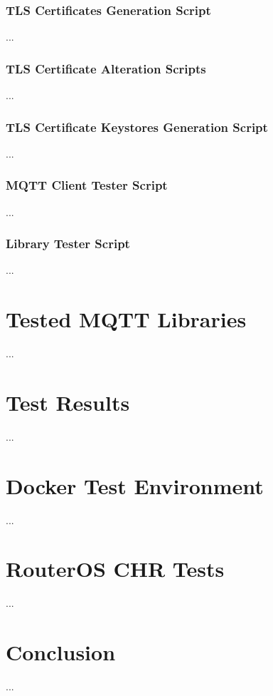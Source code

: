 \documentclass[binding=0.6cm,noexaminfo]{sapthesis}
\begin{document}
\subsection{TLS Certificates Generation Script} ...
\subsection{TLS Certificate Alteration Scripts} ...
\subsection{TLS Certificate Keystores Generation Script} ...
\subsection{MQTT Client Tester Script} ...
\subsection{Library Tester Script} ...
\chapter{Tested MQTT Libraries} ...
\chapter{Test Results} ...
\chapter{Docker Test Environment} ...
\chapter{RouterOS CHR Tests} ...
\chapter{Conclusion} ...
\backmatter
\cleardoublepage
{} %
\end{document}
